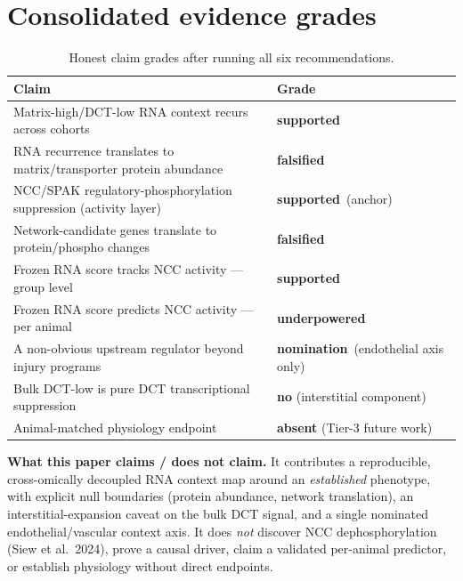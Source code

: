\documentclass[10pt]{article}
\newcommand{\grsup}{\textcolor{good}{\textbf{supported}}}
\newcommand{\fals}{\textcolor{bad}{\textbf{falsified}}}
\newcommand{\under}{\textcolor{neut}{\textbf{underpowered}}}
\newcommand{\nom}{\textcolor{neut}{\textbf{nomination}}}
\begin{document}
\section*{Consolidated evidence grades}
\begin{table}[h]
\centering\small
\renewcommand{\arraystretch}{1.2}
\begin{tabular}{p{8.6cm} l}
\toprule
\textbf{Claim} & \textbf{Grade}\\
\midrule
Matrix-high/DCT-low RNA context recurs across cohorts & \grsup\\
RNA recurrence translates to matrix/transporter protein abundance & \fals\\
NCC/SPAK regulatory-phosphorylation suppression (activity layer) & \grsup\ (anchor)\\
Network-candidate genes translate to protein/phospho changes & \fals\\
Frozen RNA score tracks NCC activity --- group level & \grsup\\
Frozen RNA score predicts NCC activity --- per animal & \under\\
A non-obvious upstream regulator beyond injury programs & \nom\ (endothelial axis only)\\
Bulk DCT-low is pure DCT transcriptional suppression & \textcolor{neut}{\textbf{no}} (interstitial component)\\
Animal-matched physiology endpoint & \textcolor{neut}{\textbf{absent}} (Tier-3 future work)\\
\bottomrule
\end{tabular}
\caption{Honest claim grades after running all six recommendations.}
\end{table}

\noindent\textbf{What this paper claims / does not claim.} It contributes a
reproducible, cross-omically decoupled RNA context map around an \emph{established}
phenotype, with explicit null boundaries (protein abundance, network translation),
an interstitial-expansion caveat on the bulk DCT signal, and a single nominated
endothelial/vascular context axis. It does \emph{not} discover NCC dephosphorylation
(Siew et al.\ 2024), prove a causal driver, claim a validated per-animal predictor,
or establish physiology without direct endpoints.
\end{document}
